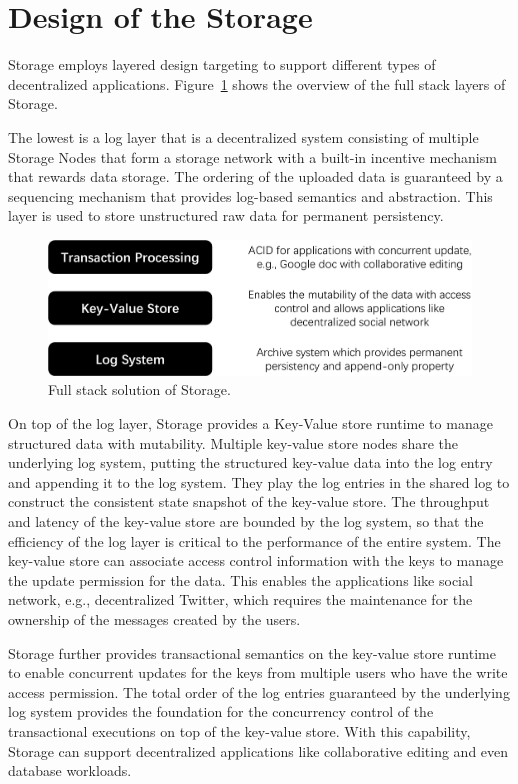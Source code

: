 \section{Design of the \projabbrev Storage}


\projabbrev Storage employs layered design targeting to support different types of decentralized applications. Figure~\ref{fig:stack} shows the overview of the full stack layers of \projabbrev Storage. 

The lowest is a log layer that is a decentralized system consisting of multiple Storage Nodes that form a storage network with a built-in incentive mechanism that rewards data storage. The ordering of the uploaded data is guaranteed by a sequencing mechanism that provides log-based semantics and abstraction. This layer is used to store unstructured raw data for permanent persistency.

\begin{figure}[H]	
	\includegraphics[width=\textwidth]{figure/stack-crop.pdf}
	\caption{Full stack solution of \projabbrev Storage.}
	\label{fig:stack}
\end{figure}

On top of the log layer, \projabbrev Storage provides a Key-Value store runtime to manage structured data with mutability. Multiple key-value store nodes share the underlying log system, putting the structured key-value data into the log entry and appending it to the log system. They play the log entries in the shared log to construct the consistent state snapshot of the key-value store. The throughput and latency of the key-value store are bounded by the log system, so that the efficiency of the log layer is critical to the performance of the entire system. The key-value store can associate access control information with the keys to manage the update permission for the data. This enables the applications like social network, e.g., decentralized Twitter, which requires the maintenance for the ownership of the messages created by the users. 

\projabbrev Storage further provides transactional semantics on the key-value store runtime to enable concurrent updates for the keys from multiple users who have the write access permission. The total order of the log entries guaranteed by the underlying log system provides the foundation for the concurrency control of the transactional executions on top of the key-value store. With this capability, \projabbrev Storage can support decentralized applications like collaborative editing and even database workloads.    
